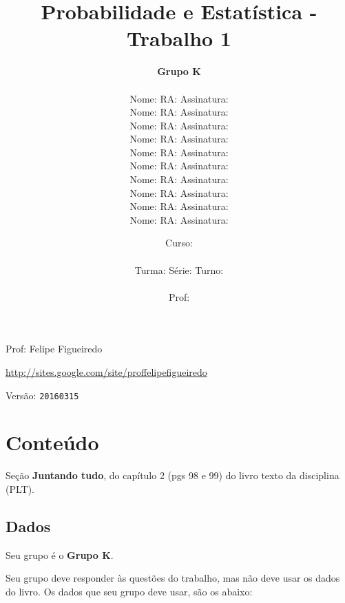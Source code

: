 \documentclass[a4paper]{article}
\date{
\bigskip
Curso: \underline{\hspace{8cm}}\\
\ \\
Turma: \underline{\hspace{1cm}} Série: \underline{\hspace{1cm}} Turno:
\underline{\hspace{1cm}}\\
\ \\
Prof: \underline{\hspace{8cm}}\\
}
\title{Probabilidade e Estatística - Trabalho 1}
\author{
{\bf Grupo K}\\
\ \\
Nome: \underline{\hspace{6cm}} RA: \underline{\hspace{2cm}} Assinatura: \underline{\hspace{4cm}}\\
Nome: \underline{\hspace{6cm}} RA: \underline{\hspace{2cm}} Assinatura: \underline{\hspace{4cm}}\\
Nome: \underline{\hspace{6cm}} RA: \underline{\hspace{2cm}} Assinatura: \underline{\hspace{4cm}}\\
Nome: \underline{\hspace{6cm}} RA: \underline{\hspace{2cm}} Assinatura: \underline{\hspace{4cm}}\\
Nome: \underline{\hspace{6cm}} RA: \underline{\hspace{2cm}} Assinatura: \underline{\hspace{4cm}}\\
Nome: \underline{\hspace{6cm}} RA: \underline{\hspace{2cm}} Assinatura: \underline{\hspace{4cm}}\\
Nome: \underline{\hspace{6cm}} RA: \underline{\hspace{2cm}} Assinatura: \underline{\hspace{4cm}}\\
Nome: \underline{\hspace{6cm}} RA: \underline{\hspace{2cm}} Assinatura: \underline{\hspace{4cm}}\\
Nome: \underline{\hspace{6cm}} RA: \underline{\hspace{2cm}} Assinatura: \underline{\hspace{4cm}}\\
Nome: \underline{\hspace{6cm}} RA: \underline{\hspace{2cm}} Assinatura: \underline{\hspace{4cm}}\\
}
\begin{document}
\maketitle
\newpage

\parbox[c]{.825\textwidth}{\raggedright%
{Prof: Felipe Figueiredo\par}
{\url{http://sites.google.com/site/proffelipefigueiredo}\par}
}

Versão: \verb|20160315|




\section{Conteúdo}

Seção {\bf Juntando tudo}, do capítulo 2 (pgs 98 e 99) do livro texto da disciplina (PLT). 

\subsection{Dados}
Seu grupo é o {\bf Grupo K}.

Seu grupo deve responder às questões do trabalho, mas não deve usar os dados do livro. Os dados que seu grupo deve usar, são os abaixo:
\end{document}
